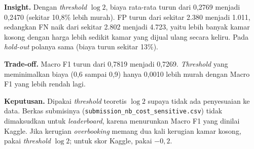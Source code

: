 {\small
\textbf{Insight.} Dengan \textit{threshold} $\log 2$, biaya rata-rata turun dari 0,2769 menjadi 0,2470 (sekitar 10,8\% lebih murah). FP turun dari sekitar 2.380 menjadi 1.011, sedangkan FN naik dari sekitar 2.802 menjadi 4.723, yaitu lebih banyak kamar kosong dengan harga lebih sedikit kamar yang dijual ulang secara keliru. Pada \textit{hold-out} polanya sama (biaya turun sekitar 13\%).
\par\smallskip
\textbf{Trade-off.} Macro F1 turun dari 0,7819 menjadi 0,7269. \textit{Threshold} yang meminimalkan biaya (0,6 sampai 0,9) hanya 0,0010 lebih murah dengan Macro F1 yang lebih rendah lagi.
\par\smallskip
\textbf{Keputusan.} Dipakai \textit{threshold} teoretis $\log 2$ supaya tidak ada penyesuaian ke data. Berkas submisinya (\texttt{submission\_nb\_cost\_sensitive.csv}) tidak dimaksudkan untuk \textit{leaderboard}, karena menurunkan Macro F1 yang dinilai Kaggle. Jika kerugian \textit{overbooking} memang dua kali kerugian kamar kosong, pakai \textit{threshold} $\log 2$; untuk skor Kaggle, pakai $-0{,}2$.\par}
